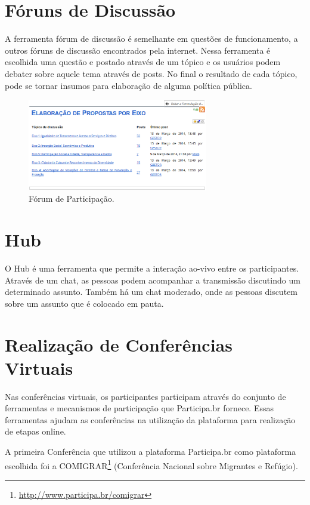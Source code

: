 \section*{Fóruns de Discussão}

A ferramenta fórum de discussão é semelhante em questões de funcionamento, a outros fóruns de discussão encontrados pela internet. Nessa ferramenta é escolhida uma questão e postado através de um tópico e os usuários podem debater sobre aquele tema através de posts. No final o resultado de cada tópico, pode se tornar insumos para elaboração de alguma política pública.

\graphicspath{{figuras/}}
\begin{figure}[H]
\centering
\includegraphics[width=0.7\textwidth]{foruns-participacao}
\caption{Fórum de Participação.}
\label{fig:forumsparticipacao}
\end{figure}

\section*{Hub}

O Hub é uma ferramenta que permite a interação ao-vivo entre os participantes. Através de um chat, as pessoas podem acompanhar a transmissão discutindo um determinado assunto. Também há um chat moderado, onde as pessoas discutem sobre um assunto que é colocado em pauta. 

\section*{Realização de Conferências Virtuais}

Nas conferências virtuais, os participantes participam através do conjunto de ferramentas e mecanismos de participação que Participa.br fornece. Essas ferramentas ajudam as conferências na utilização da plataforma para realização de etapas online.

A primeira Conferência que utilizou a plataforma Participa.br como plataforma escolhida foi a COMIGRAR\footnote{\url{http://www.participa.br/comigrar}} (Conferência Nacional sobre Migrantes e Refúgio).

